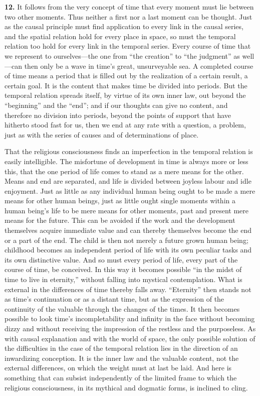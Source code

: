 \documentclass[12pt,a4paper]{book}
\newcommand{\opage}[1]{\marginnote{\footnotesize\textit{[#1]}}}
\begin{document}
\medskip

\noindent\textbf{12.} It follows from the very concept of time that every
moment must lie between two other moments. Thus neither a first nor a last
moment can be thought. Just as the causal principle must find application to
every link in the causal series, and the spatial relation hold for every
place in space, so must the temporal relation too hold for every link in the
temporal series. Every course of time that we represent to ourselves---the
one from ``the creation'' to ``the judgment'' 
\opage{33}as well---can then only be a
wave in time's great, unsurveyable sea. A completed course of time means a
period that is filled out by the realization of a certain result, a certain
goal. It is the content that makes time be divided into periods. But the
temporal relation spreads itself, by virtue of its own inner law, out beyond
the ``beginning'' and the ``end''; and if our thoughts can give no content,
and therefore no division into periods, beyond the points of support that
have hitherto stood fast for us, then we end at any rate with a question, a
problem, just as with the series of causes and of determinations of place.

That the religious consciousness finds an imperfection in the temporal
relation is easily intelligible. The misfortune of development in time is
always more or less this, that the one period of life comes to stand as a
mere means for the other. Means and end are separated, and life is divided
between joyless labour and idle enjoyment. Just as little as any individual
human being ought to be made a mere means for other human beings, just as
little ought single moments within a human being's life to be mere means for
other moments, past and present mere means for the future. This can be
avoided if the work and the development themselves acquire immediate value
and can thereby themselves become the end or a part of the end. The child is
then not merely a future grown human being; childhood becomes an independent
period of life with its own peculiar tasks and its own distinctive value. And
so must every period of life, every part of the course of time, be conceived.
In this way it becomes possible ``in the midst of time to live in eternity,''
without falling into mystical contemplation. What is external in the
differences of time thereby falls away. ``Eternity'' then stands not as time's
continuation or as a distant time, but as the expression of the continuity of
the valuable through the changes of the times. It then becomes possible to
look time's incompletability and infinity in the face without becoming dizzy
and without receiving the impression of the restless and the purposeless. As
with causal explanation and with the world of space, the only possible
solution of the difficulties in the case of the temporal relation lies in the
direction of an inwardizing conception. It is the inner law and the valuable
content, not the external differences, on which the weight must at last be
laid. And here is something that can subsist independently of the limited
frame to which the religious consciousness, in its mythical and dogmatic
forms, is inclined to cling.
\end{document}
